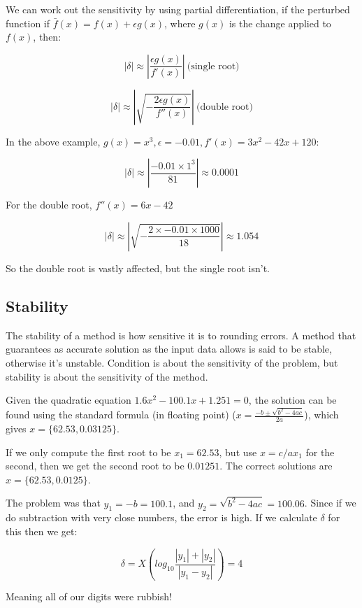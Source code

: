 We can work out the sensitivity by using partial differentiation, if the
perturbed function if $\bar{f}(x) = f(x) + \epsilon g(x)$, where $g(x)$ is the
change applied to $f(x)$, then:

\[
  |\delta| \approx |\frac{\epsilon g(x)}{f'(x)}|~\text{(single root)}
\]

\[
  |\delta| \approx |\sqrt{-\frac{2\epsilon g(x)}{f''(x)}}|~\text{(double root)}
\]

In the above example, $g(x) = x^3, \epsilon = -0.01, f'(x) = 3x^2 - 42x + 120$:

\[
  |\delta| \approx |\frac{-0.01 \times 1^3}{81}| \approx 0.0001
\]

For the double root, $f''(x) = 6x - 42$

\[
  |\delta| \approx |\sqrt{-\frac{2 \times -0.01 \times 1000}{18}}| \approx 1.054
\]

So the double root is vastly affected, but the single root isn't.

\subsection{Stability}

The stability of a method is how sensitive it is to rounding errors. A method
that guarantees as accurate solution as the input data allows is said to be
stable, otherwise it's unstable. Condition is about the sensitivity of the
problem, but stability is about the sensitivity of the method.

Given the quadratic equation $1.6x^2 - 100.1x + 1.251 = 0$, the solution can be
found using the standard formula (in floating point) ($x = \frac{-b \pm\sqrt{b^2
- 4ac}}{2a}$), which gives $x = \{62.53, 0.03125\}$.

If we only compute the first root to be $x_1 = 62.53$, but use $x = c/ax_1$ for
the second, then we get the second root to be $0.01251$. The correct solutions
are $x = \{62.53, 0.0125\}$.

The problem was that $y_1 = -b = 100.1$, and  $y_2 = \sqrt{b^2 - 4ac} = 100.06$.
Since if we do subtraction with very close numbers, the error is high. If we
calculate $\delta$ for this then we get:

\[
  \delta = X(log_10\frac{|y_1| + |y_2|}{|y_1 - y_2|}) = 4
\]

Meaning all of our digits were rubbish!




